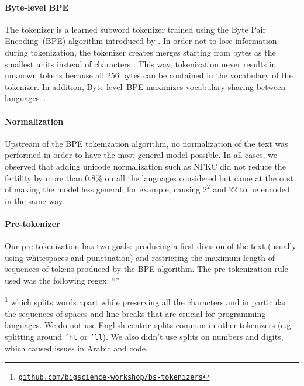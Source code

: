 \paragraph{Byte-level BPE}

The tokenizer is a learned subword tokenizer trained using the Byte Pair Encoding~(BPE) algorithm introduced by \citet{gagebpe}. In order not to lose information during tokenization, the tokenizer creates merges starting from bytes as the smallest units instead of characters \citep{radford2019language}. This way, tokenization never results in unknown tokens because all 256 bytes can be contained in the vocabulary of the tokenizer. In addition, Byte-level~BPE maximizes vocabulary sharing between languages~\citep{wang2020neural}.

\paragraph{Normalization}

 Upstream of the BPE tokenization algorithm, no normalization of the text was performed in order to have the most general model possible. In all cases, we observed that adding unicode normalization such as NFKC did not reduce the fertility by more than 0.8\% on all the languages considered but came at the cost of making the model less general; for example, causing $2^{2}$ and $2 2$ to be encoded in the same way.

\paragraph{Pre-tokenizer}

Our pre-tokenization has two goals: producing a first division of the text (usually using whitespaces and punctuation) and restricting the maximum length of sequences of tokens produced by the BPE algorithm. The pre-tokenization rule used was the following regex: ``\scalerel*{}{\textrm{\textbigcircle}}'' 

 \footnote{\href{https://github.com/bigscience-workshop/bs-tokenizers/blob/c510647dda77a37d83c756bc5a5ce85048ab66c0/tokenizers/train_tokenizer_v3_on_subset.py\#L124}{\texttt{github.com/bigscience-workshop/bs-tokenizers}}}
which splits words apart while preserving all the characters and in particular the sequences of spaces and line breaks that are crucial for programming languages. We do not use English-centric splits common in other tokenizers (e.g. splitting around \texttt{'nt} or \texttt{'ll}). We also didn't use splits on numbers and digits, which caused issues in Arabic and code.

